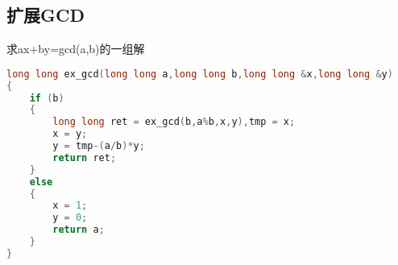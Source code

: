 \subsection{扩展GCD}
    求ax+by=gcd(a,b)的一组解
    \begin{lstlisting}[language=c++]
long long ex_gcd(long long a,long long b,long long &x,long long &y)
{
    if (b)
    {
        long long ret = ex_gcd(b,a%b,x,y),tmp = x;
        x = y;
        y = tmp-(a/b)*y;
        return ret;
    }
    else
    {
        x = 1;
        y = 0;
        return a;
    }
}
    \end{lstlisting} 